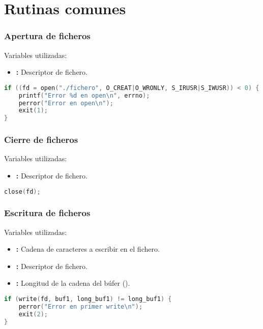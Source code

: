 \chapter{Rutinas comunes}

\subsection{Apertura de ficheros}

Variables utilizadas:

\begin{itemize}
	\item{}\textbf{:} Descriptor de fichero.
\end{itemize}

\begin{lstlisting}[language=C]
if ((fd = open("./fichero", O_CREAT|O_WRONLY, S_IRUSR|S_IWUSR)) < 0) {
	printf("Error %d en open\n", errno);
	perror("Error en open\n");
	exit(1);
}
\end{lstlisting}

\subsection{Cierre de ficheros}

Variables utilizadas:

\begin{itemize}
	\item{}\textbf{:} Descriptor de fichero.
\end{itemize}

\begin{lstlisting}[language=C]
close(fd);
\end{lstlisting}

\subsection{Escritura de ficheros}

Variables utilizadas:

\begin{itemize}
	\item{}\textbf{:} Cadena de caracteres a escribir en el fichero.
	\item{}\textbf{:} Descriptor de fichero.
	\item{}\textbf{:} Longitud de la cadena del  búfer ().
\end{itemize}

\begin{lstlisting}[language=C]
if (write(fd, buf1, long_buf1) != long_buf1) {
	perror("Error en primer write\n");
	exit(2);
}
\end{lstlisting}

